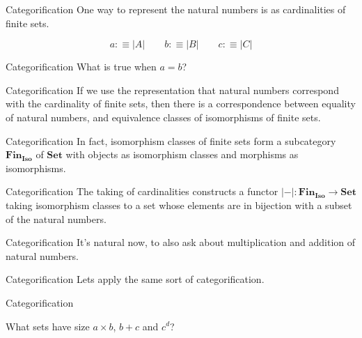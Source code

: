 \documentclass[tikz]{beamer}
\theoremstyle{definition}
\newcommand{\cat}[1]{\mathbf{#1}}
\begin{document}
\begin{frame}{Categorification}
One way to represent the natural numbers is as cardinalities of finite sets.

\begin{center}
        \begin{equation*}
            a :\equiv |A| \qquad b :\equiv |B| \qquad c :\equiv |C|
        \end{equation*}
\end{center}
\end{frame}

\begin{frame}{Categorification}
What is true when $a = b$?
\end{frame}

\begin{frame}{Categorification}
If we use the representation that natural numbers correspond with the cardinality of finite sets, 
then there is a correspondence between equality of natural numbers, and equivalence classes of isomorphisms of  
finite sets.
\end{frame}

\begin{frame}{Categorification}
In fact, isomorphism classes of finite sets form a subcategory  $\cat{Fin_{Iso}}$ of $\cat{Set}$ with objects as isomorphism classes and morphisms as isomorphisms.
\end{frame}

\begin{frame}{Categorification}
The taking of cardinalities constructs a functor $|-|\colon \cat{Fin_{Iso}} \to \cat{Set}$ taking isomorphism classes to a set whose elements are in bijection with a subset of the natural numbers.
\end{frame}

\begin{frame}{Categorification}
    It's natural now, to also ask about multiplication and addition of natural numbers.
\end{frame}

\begin{frame}{Categorification}
    Lets apply the same sort of categorification.
    
\end{frame}

\begin{frame}{Categorification}

What sets have size $a \times b$,  $b + c$ and $c^d$?

\end{frame}{}
\end{document}
